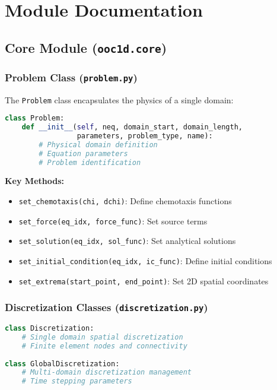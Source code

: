\documentclass[11pt,a4paper]{article}
\newcommand{\code}[1]{\texttt{#1}}
\begin{document}
\section{Module Documentation}

\subsection{Core Module (\code{ooc1d.core})}

\subsubsection{Problem Class (\code{problem.py})}

The \code{Problem} class encapsulates the physics of a single domain:

\begin{lstlisting}[language=Python, caption={Problem Class Structure}]
class Problem:
    def __init__(self, neq, domain_start, domain_length, 
                 parameters, problem_type, name):
        # Physical domain definition
        # Equation parameters
        # Problem identification
\end{lstlisting}

\textbf{Key Methods:}
\begin{itemize}
    \item \code{set\_chemotaxis(chi, dchi)}: Define chemotaxis functions
    \item \code{set\_force(eq\_idx, force\_func)}: Set source terms
    \item \code{set\_solution(eq\_idx, sol\_func)}: Set analytical solutions
    \item \code{set\_initial\_condition(eq\_idx, ic\_func)}: Define initial conditions
    \item \code{set\_extrema(start\_point, end\_point)}: Set 2D spatial coordinates
\end{itemize}

\subsubsection{Discretization Classes (\code{discretization.py})}

\begin{lstlisting}[language=Python, caption={Discretization Classes}]
class Discretization:
    # Single domain spatial discretization
    # Finite element nodes and connectivity
    
class GlobalDiscretization:
    # Multi-domain discretization management
    # Time stepping parameters
\end{lstlisting}
\end{document}
